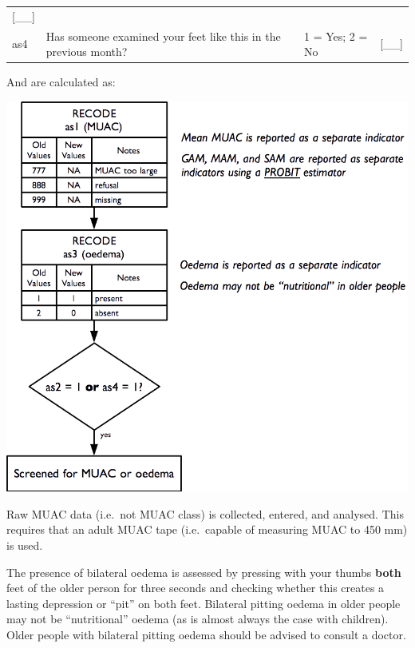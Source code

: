 \documentclass[12pt,a4paper]{book}
\theoremstyle{definition}
\theoremstyle{definition}
\theoremstyle{definition}
\theoremstyle{remark}
\begin{document}
\begin{longtable}[]{@{}llll@{}}
\begin{minipage}[t]{0.13\columnwidth}
{[}\_\_{]}\strut
\end{minipage}\tabularnewline
\begin{minipage}[t]{0.09\columnwidth}\raggedright
as4\strut
\end{minipage} & \begin{minipage}[t]{0.41\columnwidth}\raggedright
Has someone examined your feet like this in the previous month?\strut
\end{minipage} & \begin{minipage}[t]{0.25\columnwidth}\raggedright
1 = Yes; 2 = No\strut
\end{minipage} & \begin{minipage}[t]{0.13\columnwidth}\raggedright
{[}\_\_{]}\strut
\end{minipage}\tabularnewline
\bottomrule
\end{longtable}

And are calculated as:

\begin{center}\includegraphics{figures/indicators25} \end{center}

Raw MUAC data (i.e.~not MUAC class) is collected, entered, and analysed.
This requires that an adult MUAC tape (i.e.~capable of measuring MUAC to
450 mm) is used.

The presence of bilateral oedema is assessed by pressing with your
thumbs \textbf{both} feet of the older person for three seconds and
checking whether this creates a lasting depression or ``pit'' on both
feet. Bilateral pitting oedema in older people may not be
``nutritional'' oedema (as is almost always the case with children).
Older people with bilateral pitting oedema should be advised to consult
a doctor.
\end{document}
